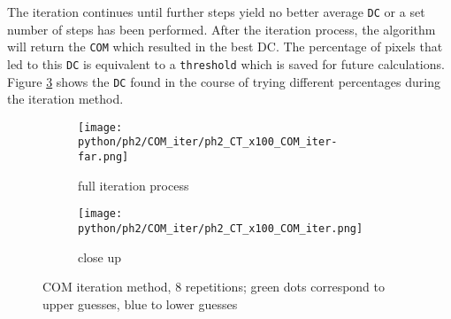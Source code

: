 The iteration continues until further steps yield no better average \texttt{DC} or a set number of steps has been performed.
After the iteration process, the algorithm will return the \texttt{COM} which resulted in the best DC.
The percentage of pixels that led to this \texttt{DC} is equivalent to a \texttt{threshold} which is saved for future calculations.
Figure \ref{fig:COM_iteration} shows the \texttt{DC}  found in the course of trying different percentages during the iteration method.


\begin{figure}[!thb]
\centering
  \begin{subfigure}[b]{1\textwidth}
  \centering
    \texttt{[image: python/ph2/COM\_iter/ph2\_CT\_x100\_COM\_iter-far.png]}
    \caption{full iteration process}
    \label{fig:CT_x100_iteration}
  \end{subfigure}
  \begin{subfigure}[b]{1\textwidth}
  \centering
    \texttt{[image: python/ph2/COM\_iter/ph2\_CT\_x100\_COM\_iter.png]}
     \caption{close up}
     \label{fig:MR_x100_iteration}
  \end{subfigure}
  \caption{COM iteration method, 8 repetitions; green dots correspond to upper guesses, blue to lower guesses}
  \label{fig:COM_iteration}
\end{figure}

